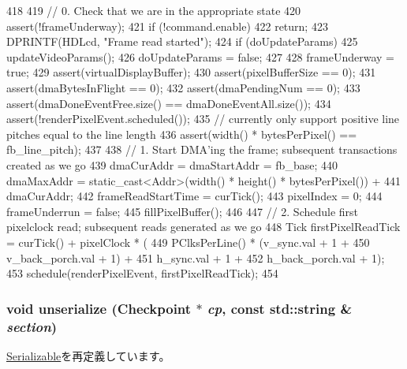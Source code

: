 \begin{DoxyCode}
418 {
419     // 0. Check that we are in the appropriate state
420     assert(!frameUnderway);
421     if (!command.enable)
422         return;
423     DPRINTF(HDLcd, "Frame read started\n");
424     if (doUpdateParams) {
425         updateVideoParams();
426         doUpdateParams = false;
427     }
428     frameUnderway = true;
429     assert(virtualDisplayBuffer);
430     assert(pixelBufferSize == 0);
431     assert(dmaBytesInFlight == 0);
432     assert(dmaPendingNum == 0);
433     assert(dmaDoneEventFree.size() == dmaDoneEventAll.size());
434     assert(!renderPixelEvent.scheduled());
435     // currently only support positive line pitches equal to the line length
436     assert(width() * bytesPerPixel() == fb_line_pitch);
437 
438     // 1. Start DMA'ing the frame; subsequent transactions created as we go
439     dmaCurAddr = dmaStartAddr = fb_base;
440     dmaMaxAddr = static_cast<Addr>(width() * height() * bytesPerPixel()) +
441                     dmaCurAddr;
442     frameReadStartTime = curTick();
443     pixelIndex = 0;
444     frameUnderrun = false;
445     fillPixelBuffer();
446 
447     // 2. Schedule first pixelclock read; subsequent reads generated as we go
448     Tick firstPixelReadTick = curTick() + pixelClock * (
449                                   PClksPerLine() * (v_sync.val + 1 +
450                                                     v_back_porch.val + 1) +
451                                   h_sync.val + 1 +
452                                   h_back_porch.val + 1);
453     schedule(renderPixelEvent, firstPixelReadTick);
454 }
\end{DoxyCode}
\hypertarget{classHDLcd_af22e5d6d660b97db37003ac61ac4ee49}{
\subsubsection[{unserialize}]{\setlength{\rightskip}{0pt plus 5cm}void unserialize ({\bf Checkpoint} $\ast$ {\em cp}, \/  const std::string \& {\em section})}}
\label{classHDLcd_af22e5d6d660b97db37003ac61ac4ee49}


\hyperlink{classSerializable_af100c4e9feabf3cd918619c88c718387}{Serializable}を再定義しています。


